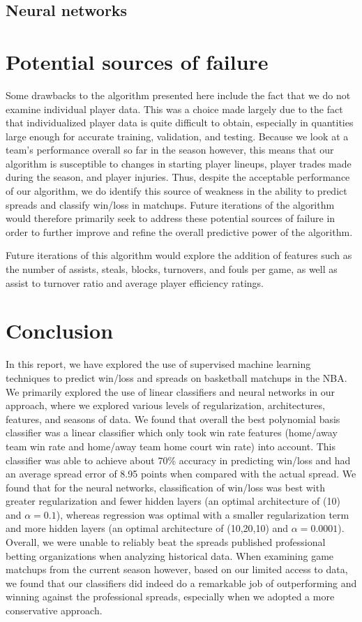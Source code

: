 \documentclass{article}
\begin{document}
\subsection{Neural networks}


\section{Potential sources of failure}
Some drawbacks to the algorithm presented here include the fact that we do not examine individual player data. This was a choice made largely due to the fact that individualized player data is quite difficult to obtain, especially in quantities large enough for accurate training, validation, and testing. Because we look at a team's performance overall so far in the season however, this means that our algorithm is susceptible to changes in starting player lineups, player trades made during the season, and player injuries. Thus, despite the acceptable performance of our algorithm, we do identify this source of weakness in the ability to predict spreads and classify win/loss in matchups. Future iterations of the algorithm would therefore primarily seek to address these potential sources of failure in order to further improve and refine the overall predictive power of the algorithm.

Future iterations of this algorithm would explore the addition of features such as the number of assists, steals, blocks, turnovers, and fouls per game, as well as assist to turnover ratio and average player efficiency ratings.

\section{Conclusion}
In this report, we have explored the use of supervised machine learning techniques to predict win/loss and spreads on basketball matchups in the NBA. We primarily explored the use of linear classifiers and neural networks in our approach, where we explored various levels of regularization, architectures, features, and seasons of data. We found that overall the best polynomial basis classifier was a linear classifier which only took win rate features (home/away team win rate and home/away team home court win rate) into account. This classifier was able to achieve about 70\% accuracy in predicting win/loss and had an average spread error of 8.95 points when compared with the actual spread. We found that for the neural networks, classification of win/loss was best with greater regularization and fewer hidden layers (an optimal architecture of (10) and $\alpha = 0.1$), whereas regression was optimal with a smaller regularization term and more hidden layers (an optimal architecture of (10,20,10) and $\alpha = 0.0001$). Overall, we were unable to reliably beat the spreads published professional betting organizations when analyzing historical data. When examining game matchups from the current season however, based on our limited access to data, we found that our classifiers did indeed do a remarkable job of outperforming and winning against the professional spreads, especially when we adopted a more conservative approach.
\end{document}
